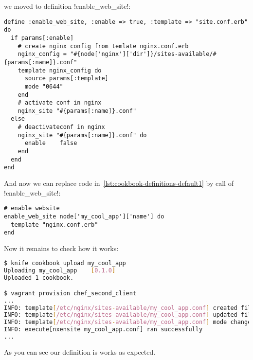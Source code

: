 we moved to definition \inline!enable_web_site!:

\begin{lstlisting}[label=lst:cookbook-definitions-enable-site,title=my-server-cloud/site-cookbooks/my\_cool\_app/definitions/enable\_web\_site.rb]
define :enable_web_site, :enable => true, :template => "site.conf.erb" do
  if params[:enable]
    # create nginx config from temlate nginx.conf.erb
    nginx_config = "#{node['nginx']['dir']}/sites-available/#{params[:name]}.conf"
    template nginx_config do
      source params[:template]
      mode "0644"
    end
    # activate conf in nginx
    nginx_site "#{params[:name]}.conf"
  else
    # deactivateconf in nginx
    nginx_site "#{params[:name]}.conf" do
      enable    false
    end
  end
end
\end{lstlisting}

And now we can replace code in~\ref{lst:cookbook-definitions-default1} by call of \inline!enable_web_site!:

\begin{lstlisting}[label=lst:cookbook-definitions-default2,title=my-server-cloud/site-cookbooks/my\_cool\_app/recipes/default.rb]
# enable website
enable_web_site node['my_cool_app']['name'] do
  template "nginx.conf.erb"
end
\end{lstlisting}

Now it remains to check how it works:

\begin{lstlisting}[language=Bash,label=lst:cookbook-definitions-shell1]
$ knife cookbook upload my_cool_app
Uploading my_cool_app    [0.1.0]
Uploaded 1 cookbook.

$ vagrant provision chef_second_client
...
INFO: template[/etc/nginx/sites-available/my_cool_app.conf] created file /etc/nginx/sites-available/my_cool_app.conf
INFO: template[/etc/nginx/sites-available/my_cool_app.conf] updated file contents /etc/nginx/sites-available/my_cool_app.conf
INFO: template[/etc/nginx/sites-available/my_cool_app.conf] mode changed to 644
INFO: execute[nxensite my_cool_app.conf] ran successfully
...
\end{lstlisting}

As you can see our definition is works as expected.